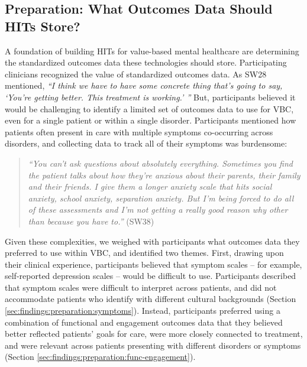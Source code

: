 \subsection{Preparation: What Outcomes Data Should HITs Store?}
\label{sec:findings:preparation}

A foundation of building HITs for value-based mental healthcare are determining the standardized outcomes data these technologies should store.
Participating clinicians recognized the value of standardized outcomes data. 
As SW28 mentioned, \textit{``I think we have to have some concrete thing that's going to say, `You're getting better. This treatment is working.' ''}
But, participants believed it would be challenging to identify a limited set of outcomes data to use for VBC, even for a single patient or within a single disorder.
Participants mentioned how patients often present in care with multiple symptoms co-occurring across disorders, and collecting data to track all of their symptoms was burdensome:

\begin{quote}
    \textit{``You can't ask questions about absolutely everything. Sometimes you find the patient talks about how they're anxious about their parents, their family and their friends. I give them a longer anxiety scale that hits social anxiety, school anxiety, separation anxiety. 
    But I'm being forced to do all of these assessments and I'm not getting a really good reason why other than because you have to.''} (SW38)
\end{quote}

Given these complexities, we weighed with participants what outcomes data they preferred to use within VBC, and identified two themes.
First, drawing upon their clinical experience, participants believed that symptom scales -- for example, self-reported depression scales -- would be difficult to use. Participants described that symptom scales were difficult to interpret across patients, and did not accommodate patients who identify with different cultural backgrounds (Section \ref{sec:findings:preparation:symptoms}).
Instead, participants preferred using a combination of functional and engagement outcomes data that they believed better reflected patients' goals for care, were more closely connected to treatment, and were relevant across patients presenting with different disorders or symptoms (Section \ref{sec:findings:preparation:func-engagement}).

